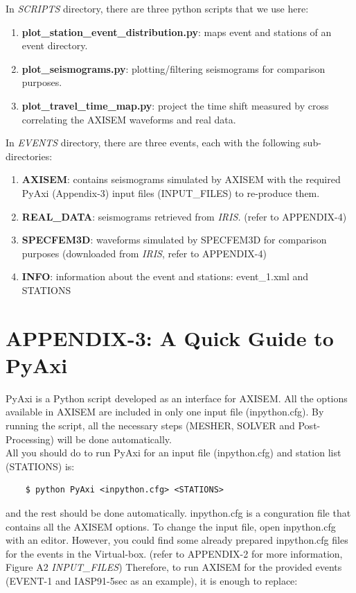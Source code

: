 \documentclass{article}
\begin{document}
In \textit{SCRIPTS} directory, there are three python scripts that we use here:

\begin{enumerate}
    \item \textbf{plot\_station\_event\_distribution.py}: maps event and stations of an
    event directory.
    \item \textbf{plot\_seismograms.py}: plotting/filtering seismograms for comparison purposes.
    \item \textbf{plot\_travel\_time\_map.py}: project the time shift measured by cross
    correlating the AXISEM waveforms and real data.
\end{enumerate}

In \textit{EVENTS} directory, there are three events, each with the following
sub-directories:

\begin{enumerate}
    \item \textbf{AXISEM}: contains seismograms simulated by AXISEM with
    the required PyAxi (Appendix-3) input files (INPUT\_FILES) to re-produce them.
    \item \textbf{REAL\_DATA}: seismograms retrieved from \textit{IRIS. }(refer to
    APPENDIX-4)
    \item \textbf{SPECFEM3D}: waveforms simulated by SPECFEM3D for comparison purposes 
    (downloaded from\textit{ IRIS}, refer to APPENDIX-4)
    \item \textbf{INFO}: information about the event and stations: event\_1.xml and
    STATIONS
\end{enumerate}


\newpage
\section{APPENDIX-3: A Quick Guide to PyAxi}

PyAxi is a Python script developed as an interface for AXISEM. All the options 
available in AXISEM are included in only one input file (inpython.cfg). By running 
the script, all the necessary steps (MESHER, SOLVER and Post-Processing) will be 
done automatically. \\

All you should do to run PyAxi for an input file (inpython.cfg) and station list 
(STATIONS) is:
\begin{verbatim}
    $ python PyAxi <inpython.cfg> <STATIONS>
\end{verbatim}

and the rest should be done automatically. inpython.cfg is a conguration file that 
contains all the AXISEM options. To change the input file, open inpython.cfg with 
an editor. However, you could find some already prepared inpython.cfg files for 
the events in the Virtual-box. (refer to APPENDIX-2 for more information, Figure A2 
\textit{INPUT\_FILES}) Therefore, to run AXISEM for the provided events (EVENT-1 
and IASP91-5sec as an example), it is enough to replace:
\end{document}
